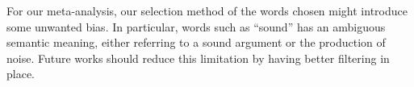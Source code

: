 \documentclass[11pt]{article}
\begin{document}
For our meta-analysis, our selection method of the words chosen might introduce some unwanted bias. In particular, words such as ``sound'' has an ambiguous semantic meaning, either referring to a sound argument or the production of noise. Future works should reduce this limitation by having better filtering in place.




%


\onecolumn
\clearpage
\appendix
\end{document}
